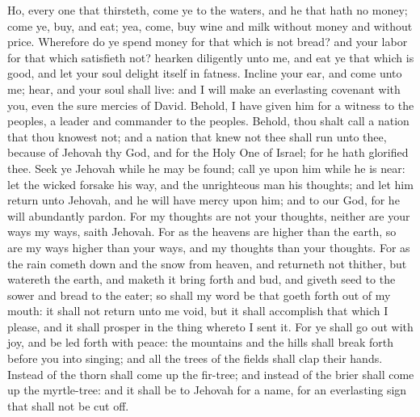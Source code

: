 Ho, every one that thirsteth, come ye to the waters, and he that hath no money; come ye, buy, and eat; yea, come, buy wine and milk without money and without price. Wherefore do ye spend money for that which is not bread? and your labor for that which satisfieth not? hearken diligently unto me, and eat ye that which is good, and let your soul delight itself in fatness. Incline your ear, and come unto me; hear, and your soul shall live: and I will make an everlasting covenant with you, even the sure mercies of David. Behold, I have given him for a witness to the peoples, a leader and commander to the peoples. Behold, thou shalt call a nation that thou knowest not; and a nation that knew not thee shall run unto thee, because of Jehovah thy God, and for the Holy One of Israel; for he hath glorified thee.  Seek ye Jehovah while he may be found; call ye upon him while he is near: let the wicked forsake his way, and the unrighteous man his thoughts; and let him return unto Jehovah, and he will have mercy upon him; and to our God, for he will abundantly pardon. For my thoughts are not your thoughts, neither are your ways my ways, saith Jehovah. For as the heavens are higher than the earth, so are my ways higher than your ways, and my thoughts than your thoughts. For as the rain cometh down and the snow from heaven, and returneth not thither, but watereth the earth, and maketh it bring forth and bud, and giveth seed to the sower and bread to the eater; so shall my word be that goeth forth out of my mouth: it shall not return unto me void, but it shall accomplish that which I please, and it shall prosper in the thing whereto I sent it. For ye shall go out with joy, and be led forth with peace: the mountains and the hills shall break forth before you into singing; and all the trees of the fields shall clap their hands. Instead of the thorn shall come up the fir-tree; and instead of the brier shall come up the myrtle-tree: and it shall be to Jehovah for a name, for an everlasting sign that shall not be cut off. 

